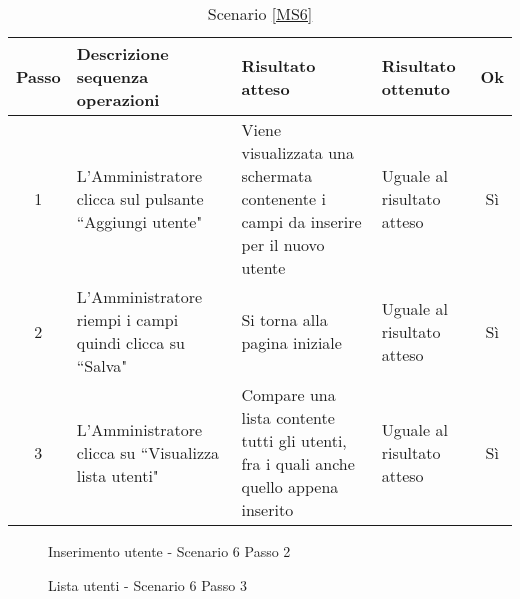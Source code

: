  {
 \footnotesize
  \begin{longtable}{|c|p{3cm}|p{3cm}|p{3cm}|c|}
    \caption{Scenario \ref{MS6}}\\
    \hline
    Passo & Descrizione sequenza operazioni & Risultato atteso & Risultato ottenuto & Ok\\
    \hline
    1 & L'Amministratore clicca sul pulsante ``Aggiungi utente" & Viene visualizzata una schermata contenente i campi da inserire per il nuovo utente& Uguale 
      al risultato atteso& Sì\\
    \hline
    2 & L'Amministratore riempi i campi quindi clicca su ``Salva"& Si torna alla pagina iniziale & Uguale al risultato atteso & Sì \\
    \hline
     3 & L'Amministratore clicca su ``Visualizza lista utenti"& Compare una lista contente tutti gli utenti, fra i quali anche quello appena inserito & Uguale al risultato atteso & Sì \\
    \hline
\end{longtable}

}




\begin{figure}[h!]
	\centering
	\caption{Inserimento utente - Scenario 6 Passo 2}
	\label{creazioneUtente}
\end{figure}


\begin{figure}[h!]
	\centering
	\caption{Lista utenti - Scenario 6 Passo 3}
	\label{ListaUtenti}
\end{figure}
